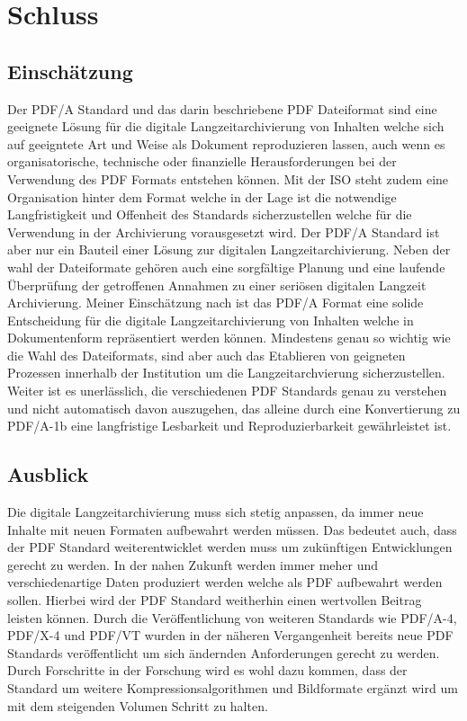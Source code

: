 \documentclass[a4paper,oneside, 12pt]{report}
\begin{document}
\chapter{Schluss}\label{sec:schluss}
\section{Einschätzung}
Der PDF/A Standard und das darin beschriebene PDF Dateiformat sind eine geeignete Lösung für die digitale Langzeitarchivierung von Inhalten welche sich auf geeigntete Art und Weise als Dokument reproduzieren lassen, auch wenn es organisatorische, technische oder finanzielle Herausforderungen bei der Verwendung des PDF Formats entstehen können. Mit der \ac{ISO} steht zudem eine Organisation hinter dem Format welche in der Lage ist die notwendige Langfristigkeit und Offenheit des Standards sicherzustellen welche für die Verwendung in der Archivierung vorausgesetzt wird. Der PDF/A Standard ist aber nur ein Bauteil einer Lösung zur digitalen Langzeitarchivierung. Neben der wahl der Dateiformate gehören auch eine sorgfältige Planung und eine laufende Überprüfung der getroffenen Annahmen zu einer seriösen digitalen Langzeit Archivierung. Meiner Einschätzung nach ist das PDF/A Format eine solide Entscheidung für die digitale Langzeitarchivierung von Inhalten welche in Dokumentenform repräsentiert werden können. Mindestens genau so wichtig wie die Wahl des Dateiformats, sind aber auch das Etablieren von geigneten Prozessen innerhalb der Institution um die Langzeitarchvierung sicherzustellen.
Weiter ist es unerlässlich, die verschiedenen PDF Standards genau zu verstehen und nicht automatisch davon auszugehen, das alleine durch eine Konvertierung zu PDF/A-1b eine langfristige Lesbarkeit und Reproduzierbarkeit gewährleistet ist.

\section{Ausblick}
Die digitale Langzeitarchivierung muss sich stetig anpassen, da immer neue Inhalte mit neuen Formaten aufbewahrt werden müssen. Das bedeutet auch, dass der PDF Standard weiterentwicklet werden muss um zukünftigen Entwicklungen gerecht zu werden. In der nahen Zukunft werden immer meher und verschiedenartige Daten produziert werden welche als PDF aufbewahrt werden sollen. Hierbei wird der PDF Standard weitherhin einen wertvollen Beitrag leisten können. Durch die Veröffentlichung von weiteren Standards wie PDF/A-4, PDF/X-4 und PDF/VT wurden in der näheren Vergangenheit bereits neue PDF Standards veröffentlicht um sich ändernden Anforderungen gerecht zu werden. Durch Forschritte in der Forschung wird es wohl dazu kommen, dass der Standard um weitere Kompressionsalgorithmen und Bildformate ergänzt wird um mit dem steigenden Volumen Schritt zu halten.
\end{document}
